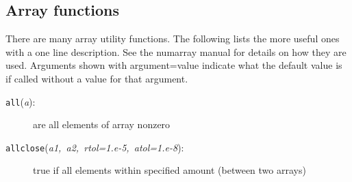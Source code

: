 \subsection{Array functions}

There are many array utility functions. The following lists the more
useful ones with a one line description. See the numarray manual for
details on how they are used. Arguments shown with argument=value
indicate what the default value is if called without a value for that
argument.

\begin{description}
\item [{\texttt{all}\textmd{(}\textmd{\emph{a}}\textmd{):}}] are all elements
of array nonzero
\item [{\texttt{allclose}\textmd{(}\textmd{\emph{a1,~a2,~rtol=1.e-5,~atol=1.e-8}}\textmd{):}}] true
if all elements within specified amount (between two arrays)


\end{description}
